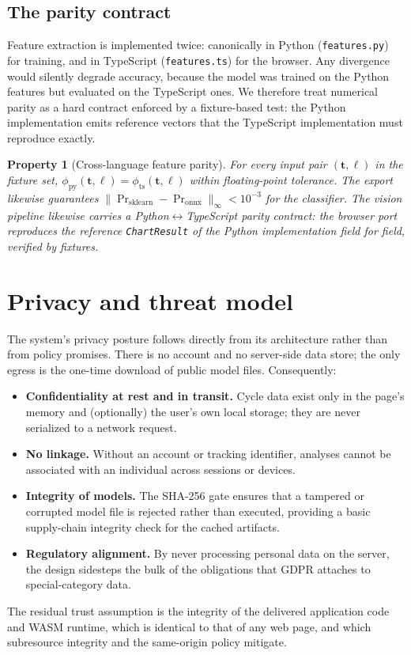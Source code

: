 \documentclass[11pt,a4paper]{article}
\newtheorem{property}{Property}
\newcommand{\code}[1]{\texttt{\small #1}}
\newcommand{\file}[1]{\texttt{\small\color{NavyBlue!70!black}#1}}
\begin{document}
\subsection{The parity contract}
Feature extraction is implemented twice: canonically in Python
(\file{features.py}) for training, and in TypeScript (\file{features.ts}) for
the browser. Any divergence would silently degrade accuracy, because the model
was trained on the Python features but evaluated on the TypeScript ones. We
therefore treat numerical parity as a hard contract enforced by a fixture-based
test: the Python implementation emits reference vectors that the TypeScript
implementation must reproduce exactly.

\begin{property}[Cross-language feature parity]
For every input pair $(\bm t, \bm\ell)$ in the fixture set,
$\phi_{\text{py}}(\bm t,\bm\ell) = \phi_{\text{ts}}(\bm t,\bm\ell)$ within
floating-point tolerance. The export likewise guarantees
$\big\lVert \Pr_{\text{sklearn}} - \Pr_{\text{onnx}} \big\rVert_\infty < 10^{-3}$
for the classifier. The vision pipeline likewise carries a
Python$\leftrightarrow$TypeScript parity contract: the browser port reproduces
the reference \code{ChartResult} of the Python implementation field for field,
verified by fixtures.
\end{property}

\section{Privacy and threat model}

The system's privacy posture follows directly from its architecture rather
than from policy promises. There is no account and no server-side data
store; the only egress is the one-time download of public model files.
Consequently:
\begin{itemize}
  \item \textbf{Confidentiality at rest and in transit.} Cycle data exist only in
  the page's memory and (optionally) the user's own local storage; they are never
  serialized to a network request.
  \item \textbf{No linkage.} Without an account or tracking identifier, analyses
  cannot be associated with an individual across sessions or devices.
  \item \textbf{Integrity of models.} The SHA-256 gate ensures that a tampered or
  corrupted model file is rejected rather than executed, providing a basic
  supply-chain integrity check for the cached artifacts.
  \item \textbf{Regulatory alignment.} By never processing personal data on the
  server, the design sidesteps the bulk of the obligations that GDPR
  \cite{gdpr2016} attaches to special-category data.
\end{itemize}
The residual trust assumption is the integrity of the delivered application
code and WASM runtime, which is identical to that of any web page, and
which subresource integrity and the same-origin policy mitigate.
\end{document}
